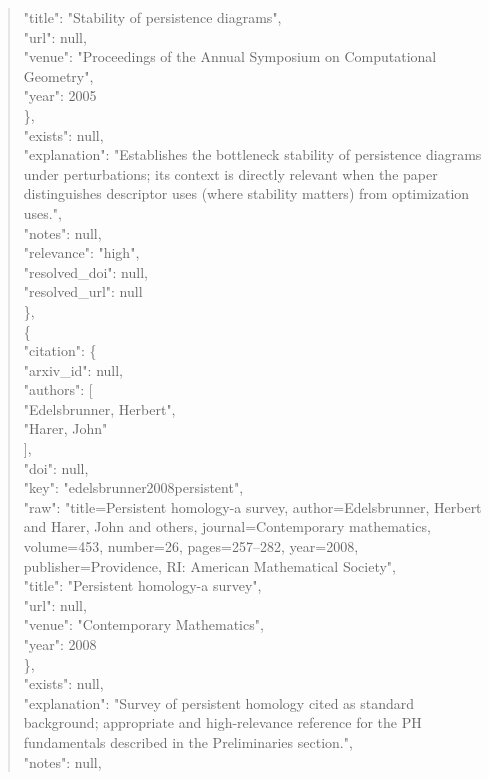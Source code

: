 \documentclass[11pt]{article}
\begin{document}
\begin{quote}
        "title": "Stability of persistence diagrams",\\
        "url": null,\\
        "venue": "Proceedings of the Annual Symposium on Computational Geometry",\\
        "year": 2005\\
      \},\\
      "exists": null,\\
      "explanation": "Establishes the bottleneck stability of persistence diagrams under perturbations; its context is directly relevant when the paper distinguishes descriptor uses (where stability matters) from optimization uses.",\\
      "notes": null,\\
      "relevance": "high",\\
      "resolved\_doi": null,\\
      "resolved\_url": null\\
    \},\\
    \{\\
      "citation": \{\\
        "arxiv\_id": null,\\
        "authors": [\\
          "Edelsbrunner, Herbert",\\
          "Harer, John"\\
        ],\\
        "doi": null,\\
        "key": "edelsbrunner2008persistent",\\
        "raw": "title=Persistent homology-a survey, author=Edelsbrunner, Herbert and Harer, John and others, journal=Contemporary mathematics, volume=453, number=26, pages=257--282, year=2008, publisher=Providence, RI: American Mathematical Society",\\
        "title": "Persistent homology-a survey",\\
        "url": null,\\
        "venue": "Contemporary Mathematics",\\
        "year": 2008\\
      \},\\
      "exists": null,\\
      "explanation": "Survey of persistent homology cited as standard background; appropriate and high-relevance reference for the PH fundamentals described in the Preliminaries section.",\\
      "notes": null,\\

\end{quote}
\end{document}
